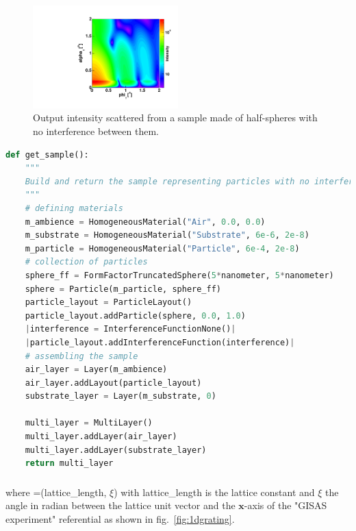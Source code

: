\begin{figure}[ht]
\begin{center}
\includegraphics[width=0.5\textwidth]{Figures/HSphere_NoInterf}
\end{center}
\caption{Output intensity scattered from a sample made of half-spheres with no interference between them.}
\label{fig:nointerf}
\end{figure}

\FloatBarrier
\newpage

\begin{lstlisting}[language=python, style=eclipseboxed,numbers=none,nolol,caption={\Code{Python} script to simulate a sample made of half-spheres deposited on a substrate layer without any interference. The part specific to the interferences is marked in red italic font.},label={lst:nointerf}]
def get_sample():
    """
    Build and return the sample representing particles with no interference
    """
    # defining materials
    m_ambience = HomogeneousMaterial("Air", 0.0, 0.0)
    m_substrate = HomogeneousMaterial("Substrate", 6e-6, 2e-8)
    m_particle = HomogeneousMaterial("Particle", 6e-4, 2e-8)
    # collection of particles
    sphere_ff = FormFactorTruncatedSphere(5*nanometer, 5*nanometer)
    sphere = Particle(m_particle, sphere_ff)
    particle_layout = ParticleLayout()
    particle_layout.addParticle(sphere, 0.0, 1.0)
    |interference = InterferenceFunctionNone()| 
    |particle_layout.addInterferenceFunction(interference)|
    # assembling the sample
    air_layer = Layer(m_ambience)
    air_layer.addLayout(particle_layout)
    substrate_layer = Layer(m_substrate, 0)

    multi_layer = MultiLayer()
    multi_layer.addLayer(air_layer)
    multi_layer.addLayer(substrate_layer)
    return multi_layer
\end{lstlisting}

\newpage{\cleardoublepage}
\subsubsection{  } \label{paragraph1dlatt}
where  =(lattice\_length, $\xi$) with lattice\_length is the lattice constant and $\xi$ the angle in radian between the lattice unit vector and the $\mathbf{x}$-axis of the "GISAS experiment" referential as shown in fig.~\ref{fig:1dgrating}.

